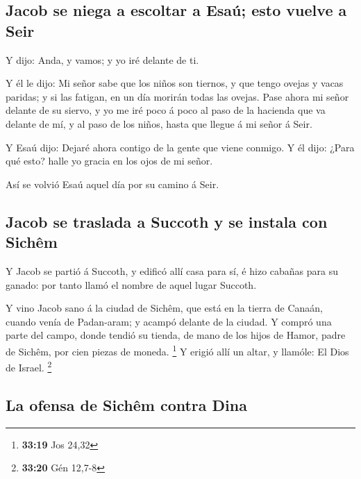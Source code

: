 \hypertarget{jacob-se-niega-a-escoltar-a-esauxfa-esto-vuelve-a-seir}{%
\subsection{Jacob se niega a escoltar a Esaú; esto vuelve a
Seir}\label{jacob-se-niega-a-escoltar-a-esauxfa-esto-vuelve-a-seir}}

 Y dijo: Anda, y vamos; y yo iré delante de ti.

 Y él le dijo: Mi señor sabe que los niños son tiernos, y
que tengo ovejas y vacas paridas; y si las fatigan, en un día morirán
todas las ovejas.  Pase ahora mi señor delante de su
siervo, y yo me iré poco á poco al paso de la hacienda que va delante de
mí, y al paso de los niños, hasta que llegue á mi señor á Seir.

 Y Esaú dijo: Dejaré ahora contigo de la gente que viene
conmigo. Y él dijo: ¿Para qué esto? halle yo gracia en los ojos de mi
señor.

 Así se volvió Esaú aquel día por su camino á Seir.

\hypertarget{jacob-se-traslada-a-succoth-y-se-instala-con-sichuxeam}{%
\subsection{Jacob se traslada a Succoth y se instala con
Sichêm}\label{jacob-se-traslada-a-succoth-y-se-instala-con-sichuxeam}}

 Y Jacob se partió á Succoth, y edificó allí casa para
sí, é hizo cabañas para su ganado: por tanto llamó el nombre de aquel
lugar Succoth.

 Y vino Jacob sano á la ciudad de Sichêm, que está en la
tierra de Canaán, cuando venía de Padan-aram; y acampó delante de la
ciudad.  Y compró una parte del campo, donde tendió su
tienda, de mano de los hijos de Hamor, padre de Sichêm, por cien piezas
de moneda. \footnote{\textbf{33:19} Jos 24,32}  Y erigió
allí un altar, y llamóle: El Dios de Israel. \footnote{\textbf{33:20}
  Gén 12,7-8}

\hypertarget{la-ofensa-de-sichuxeam-contra-dina}{%
\subsection{La ofensa de Sichêm contra
Dina}\label{la-ofensa-de-sichuxeam-contra-dina}}

